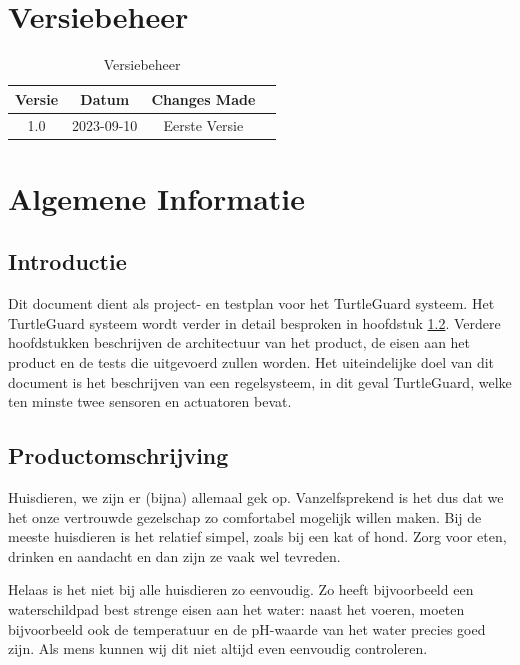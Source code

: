 \documentclass[a4paper]{report}
\newcommand{\turtleguard}{\mbox{TurtleGuard\texttrademark}\xspace}
\begin{document}
\tableofcontents

\chapter*{Versiebeheer}
\thispagestyle{empty}  %
\begin{table}[h]
    \centering
    \begin{tabular}{|c|c|c|p{5cm}|}
        \hline
        Versie & Datum      & Changes Made  \\
        \hline
        1.0    & 2023-09-10 & Eerste Versie \\
        \hline
    \end{tabular}
    \caption{Versiebeheer}
\end{table}
\clearpage  %

\chapter{Algemene Informatie}
\section{Introductie}
Dit document dient als project- en testplan voor het \turtleguard systeem. Het \turtleguard systeem wordt verder in detail besproken in hoofdstuk \ref{section-product}.
Verdere hoofdstukken beschrijven de architectuur van het product, de eisen aan het product en de tests die uitgevoerd zullen worden.
Het uiteindelijke doel van dit document is het beschrijven van een regelsysteem, in dit geval \turtleguard, welke ten minste twee sensoren en actuatoren bevat. 

\section{Productomschrijving}
\label{section-product}
Huisdieren, we zijn er (bijna) allemaal gek op. Vanzelfsprekend is het dus dat we het onze vertrouwde gezelschap zo comfortabel mogelijk willen maken.
Bij de meeste huisdieren is het relatief simpel, \mbox{zoals} bij een kat of hond. Zorg voor eten, drinken en aandacht en dan zijn ze vaak wel tevreden.
\par \smallskip
Helaas is het niet bij alle huisdieren zo eenvoudig. 
Zo heeft bijvoorbeeld een waterschildpad best strenge eisen aan het water: naast het voeren, moeten bijvoorbeeld ook de temperatuur en de \mbox{pH-waarde} van het water precies goed zijn.  
Als mens kunnen wij dit niet altijd even eenvoudig controleren. \par \smallskip 
\end{document}
